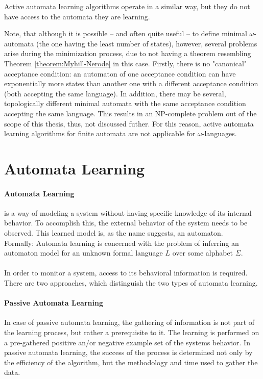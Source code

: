 Active automata learning algorithms operate in a similar way, but they do not have access to the automata they are learning.

Note, that although it is possible -- and often quite useful -- to define minimal  $\omega$-automata (the one having the least number of states), however, several problems arise during the minimization process, due to not having a theorem resembling Theorem \ref{theorem:Myhill-Nerode} in this case. Firstly, there is no "canonical" acceptance condition: an automaton of one acceptance condition can have exponentially more states than another one with a different acceptance condition (both accepting the same language). In addition, there may be several, topologically different minimal automata with the same acceptance condition accepting the same language. This results in an NP-complete problem out of the scope of this thesis, thus, not discussed futher. For this reason, active automata learning algorithms for finite automata are not applicable for $\omega$-languages. 

\section{Automata Learning}

\paragraph{Automata Learning}  is a way of modeling a system without having specific knowledge of its internal behavior. To accomplish this, the external behavior of the system needs to be observed. This learned model is, as the name suggests, an automaton. 
\\Formally: Automata  learning is  concerned  with  the  problem  of  inferring  an automaton model for an unknown formal language $L$ over some alphabet $\Sigma$\cite{Howar2018}.
\\\\In order to monitor a system, access to its behavioral information is required. There are two approaches, which distinguish the two types of automata learning.

\paragraph{Passive Automata Learning} In case of passive automata learning, the gathering of information is not part of the learning process, but rather a prerequisite to it. The learning is performed on a pre-gathered positive an/or negative example set of the systems behavior. In passive automata learning, the success of the process is determined not only by the efficiency of the algorithm, but the methodology and time used to gather the data.

